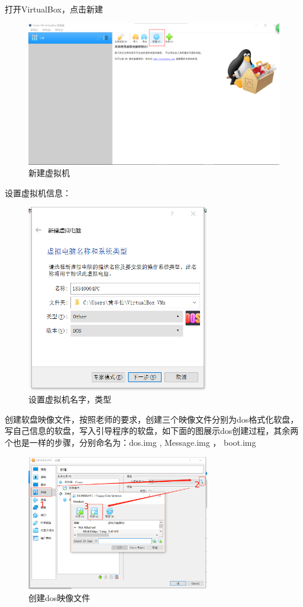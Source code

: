 \documentclass[12pt]{article}
\begin{document}
\paragraph{}打开VirtualBox，点击新建	
	\begin{figure}[H]
			\centering
			\includegraphics[width=14cm]{./figures/open.png}
			\caption{新建虚拟机} 
		\end{figure}	
设置虚拟机信息：
	\begin{figure}[H]
			\centering
			\includegraphics[width=8cm]{./figures/create.png}
			\caption{设置虚拟机名字，类型} 
		\end{figure}	

创建软盘映像文件，按照老师的要求，创建三个映像文件分别为dos格式化软盘，写自己信息的软盘，写入引导程序的软盘，如下面的图展示dos创建过程，其余两个也是一样的步骤，分别命名为：dos.img , Message.img ， boot.img
	\begin{figure}[H]
			\centering
			\includegraphics[width=8cm]{./figures/createimg.png}
			\caption{创建dos映像文件} 
		\end{figure}	
\end{document}
